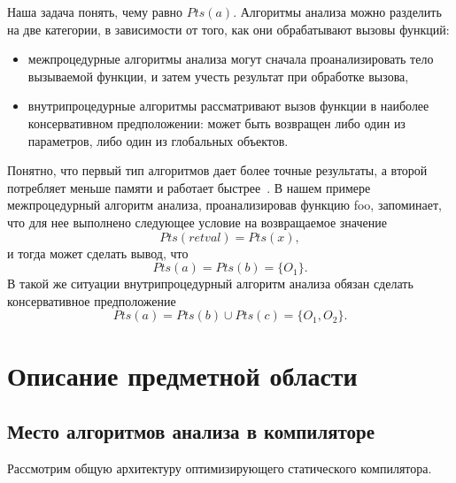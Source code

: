 \documentclass[14pt,titlepage]{extarticle}
\let\oldsection\section
\renewcommand{\section}{\newpage\oldsection}
\begin{document}
        Наша задача понять, чему равно $Pts(a)$.
        Алгоритмы анализа можно разделить на две категории, в зависимости от
        того, как они обрабатывают вызовы функций:
        \begin{itemize}
          \item межпроцедурные алгоритмы анализа могут сначала проанализировать
                тело вызываемой функции, и затем учесть результат при обработке
                вызова,
          \item внутрипроцедурные алгоритмы рассматривают вызов функции в
                наиболее консервативном предположении: может быть возвращен
                либо один из параметров, либо один из глобальных объектов.
        \end{itemize}
        Понятно, что первый тип алгоритмов дает более точные результаты,
        а второй потребляет меньше памяти и работает
        быстрее~\cite[с.~117]{andersen}.
        В нашем примере межпроцедурный алгоритм анализа, проанализировав
        функцию foo, запоминает, что для нее выполнено следующее условие на
        возвращаемое значение
        \[Pts(retval) = Pts(x),\]
        и тогда может сделать вывод, что \[Pts(a) = Pts(b) = \{O_1\}.\]
        В такой же ситуации внутрипроцедурный алгоритм анализа обязан сделать
        консервативное предположение
        \[Pts(a) = Pts(b) \cup Pts(c) = \{O_1, O_2\}.\]

  \section{Описание предметной области}

    \subsection{Место алгоритмов анализа в компиляторе}

      Рассмотрим общую архитектуру оптимизирующего статического компилятора.
\end{document}
